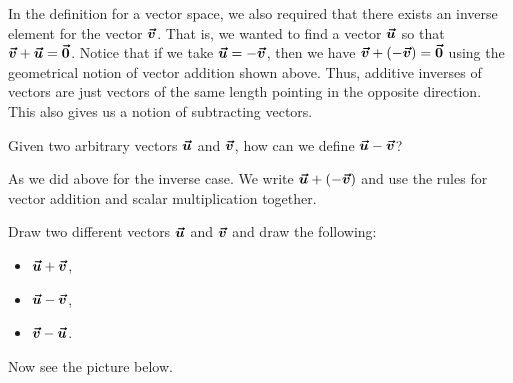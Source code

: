         In the definition for a vector space, we also required that there exists an inverse element for the vector $\vecv$. That is, we wanted to find a vector $\vecu$ so that $\vecv+\vecu=\zerovec$.  Notice that if we take $\vecu=-\vecv$, then we have $\vecv+(-\vecv)=\zerovec$ using the geometrical notion of vector addition shown above.  Thus, additive inverses of vectors are just vectors of the same length pointing in the opposite direction.  This also gives us a notion of subtracting vectors.
        
        \begin{question}
        Given two arbitrary vectors $\vecu$ and $\vecv$, how can we define $\vecu-\vecv$?  
        \end{question}
        
        \begin{answer}
        As we did above for the inverse case. We write $\vecu+(-\vecv)$ and use the rules for vector addition and scalar multiplication together.
        \end{answer}
        
        \begin{exercise}
        Draw two different vectors $\vecu$ and $\vecv$ and draw the following:
        \begin{itemize}
            \item $\vecu+\vecv$,
            \item $\vecu-\vecv$,
            \item $\vecv-\vecu$.
        \end{itemize}
        \end{exercise}
        
        Now see the picture below.
        
        \begin{center}
        \end{center}
        
